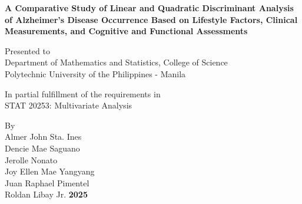 \documentclass[12pt]{article}
\begin{document}
\begin{titlepage}
    \thispagestyle{fancy}
    \fancyfoot[C]{\textcolor{white}{\thepage}}
    \centering
    \vspace*{2cm}  %
    \textbf{A Comparative Study of Linear and Quadratic Discriminant Analysis of Alzheimer's Disease Occurrence Based 
    on Lifestyle Factors, Clinical Measurements, and Cognitive and Functional Assessments}
    
    \vspace*{2cm} 
    Presented to \\
    Department of Mathematics and Statistics, College of Science \\
    Polytechnic University of the Philippines - Manila

    \vspace*{2cm} 
    \normalsize
    In partial fulfillment of the requirements in \\ 
    STAT 20253: Multivariate Analysis

    \vspace*{3cm}
    By \\ [0.5 cm]
    Almer John Sta. Ines \\ [0.3 cm]
    Dencie Mae Saguano \\ [0.3 cm]
    Jerolle Nonato \\ [0.3 cm]
    Joy Ellen Mae Yangyang \\ [0.3 cm]
    Juan Raphael Pimentel \\ [0.3 cm]
    Roldan Libay Jr. 
    \vfill
    \textbf{2025}
\end{titlepage}
\end{document}
